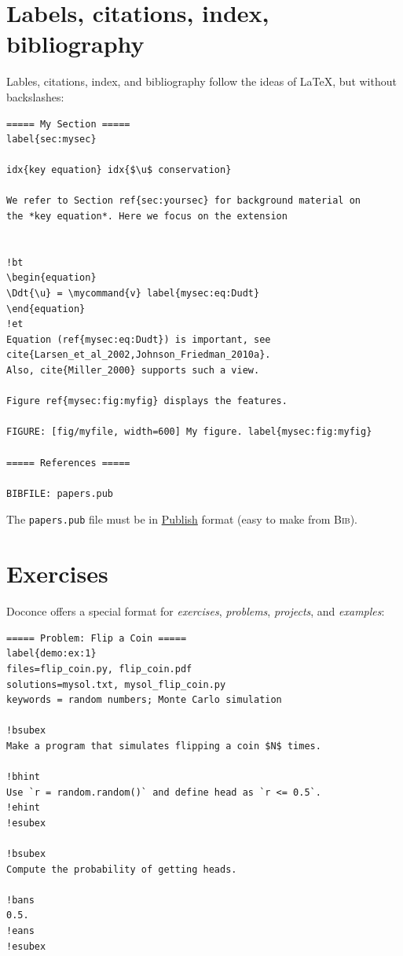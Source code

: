 \documentclass[%
twoside,                 %
final,                   %
chapterprefix=true,      %
open=right               %
10pt]{book}
\begin{document}
\noindent
\section*{Labels, citations, index, bibliography}

Lables, citations, index, and bibliography follow the ideas of
{\LaTeX}, but without backslashes:

\begin{Verbatim}[numbers=none,fontsize=\fontsize{9pt}{9pt},baselinestretch=0.95]
===== My Section =====
label{sec:mysec}

idx{key equation} idx{$\u$ conservation}

We refer to Section ref{sec:yoursec} for background material on
the *key equation*. Here we focus on the extension


!bt
\begin{equation}
\Ddt{\u} = \mycommand{v} label{mysec:eq:Dudt}
\end{equation}
!et
Equation (ref{mysec:eq:Dudt}) is important, see
cite{Larsen_et_al_2002,Johnson_Friedman_2010a}.
Also, cite{Miller_2000} supports such a view.

Figure ref{mysec:fig:myfig} displays the features.

FIGURE: [fig/myfile, width=600] My figure. label{mysec:fig:myfig}

===== References =====

BIBFILE: papers.pub
\end{Verbatim}
The \Verb!papers.pub! file must be in \href{{https://bitbucket.org/logg/publish}}{Publish}
format (easy to make from \textsc{Bib}\negthinspace{\TeX}).

\section*{Exercises}

Doconce offers a special format for \emph{exercises}, \emph{problems}, \emph{projects},
and \emph{examples}:

\begin{Verbatim}[numbers=none,fontsize=\fontsize{9pt}{9pt},baselinestretch=0.95]
===== Problem: Flip a Coin =====
label{demo:ex:1}
files=flip_coin.py, flip_coin.pdf
solutions=mysol.txt, mysol_flip_coin.py
keywords = random numbers; Monte Carlo simulation

!bsubex
Make a program that simulates flipping a coin $N$ times.

!bhint
Use `r = random.random()` and define head as `r <= 0.5`.
!ehint
!esubex

!bsubex
Compute the probability of getting heads.

!bans
0.5.
!eans
!esubex
\end{Verbatim}
\end{document}
